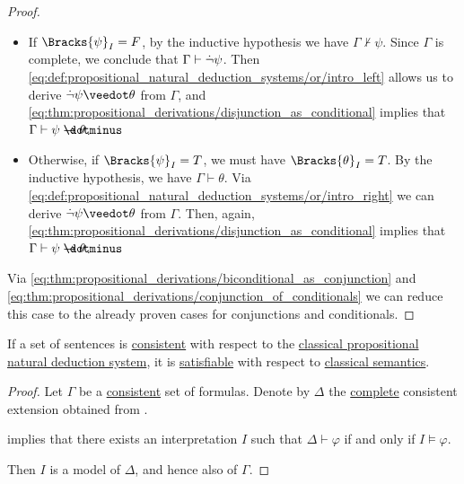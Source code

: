 \begin{proof}
  \begin{itemize}
    \item If \( \Bracks{\psi}_I = F \), by the inductive hypothesis we have \( \Gamma \not\vdash \psi \). Since \( \Gamma \) is complete, we conclude that \( \Gamma \vdash \dot\neg \psi \). Then \ref{eq:def:propositional_natural_deduction_systems/or/intro_left} allows us to derive \( \synneg \psi \synvee \theta \) from \( \Gamma \), and \eqref{eq:thm:propositional_derivations/disjunction_as_conditional} implies that \( \Gamma \vdash \psi \synimplies \theta \).

    \item Otherwise, if \( \Bracks{\psi}_I = T \), we must have \( \Bracks{\theta}_I = T \). By the inductive hypothesis, we have \( \Gamma \vdash \theta \). Via \ref{eq:def:propositional_natural_deduction_systems/or/intro_right} we can derive \( \synneg \psi \synvee \theta \) from \( \Gamma \). Then, again, \eqref{eq:thm:propositional_derivations/disjunction_as_conditional} implies that \( \Gamma \vdash \psi \synimplies \theta \).
  \end{itemize}

   Via \eqref{eq:thm:propositional_derivations/biconditional_as_conjunction} and \eqref{eq:thm:propositional_derivations/conjunction_of_conditionals} we can reduce this case to the already proven cases for conjunctions and conditionals.
\end{proof}

\begin{corollary}\label{thm:consistent_implies_satisfiable}
  If a set of sentences is \hyperref[def:consistent_set_of_sentences]{consistent} with respect to the \hyperref[def:propositional_natural_deduction_system]{classical propositional natural deduction system}, it is \hyperref[def:satisfiable_set_of_sentences]{satisfiable} with respect to \hyperref[def:classical_semantics]{classical semantics}.
\end{corollary}
\begin{proof}
  Let \( \Gamma \) be a \hyperref[def:consistent_set_of_sentences]{consistent} set of formulas. Denote by \( \Delta \) the \hyperref[def:complete_set_of_sentences]{complete} consistent extension obtained from .

   implies that there exists an interpretation \( I \) such that \( \Delta \vdash \varphi \) if and only if \( I \vDash \varphi \).

  Then \( I \) is a model of \( \Delta \), and hence also of \( \Gamma \).
\end{proof}

